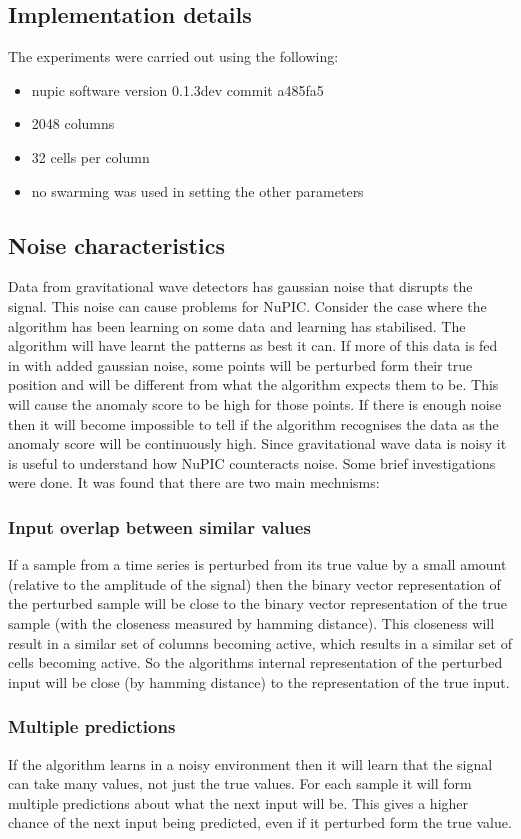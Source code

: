 \documentclass[a4paper]{jpconf}
\begin{document}
		
	\subsection{Implementation details}
		The experiments were carried out using the following:
		\begin{itemize}
		\item nupic software version 0.1.3dev commit a485fa5
		\item 2048 columns
		\item 32 cells per column
		\item no swarming was used in setting the other parameters
		\end{itemize}

	\subsection{Noise characteristics}
		Data from gravitational wave detectors has gaussian noise that disrupts the signal. This noise can cause problems for NuPIC. Consider the case where the algorithm has been learning on some data and learning has stabilised. The algorithm will have learnt the patterns as best it can. If more of this data is fed in with added gaussian noise, some points will be perturbed form their true position and will be different from what the algorithm expects them to be. This will cause the anomaly score to be high for those points. If there is enough noise then it will become impossible to tell if the algorithm recognises the data as the anomaly score will be continuously high. Since gravitational wave data is noisy it is useful to understand how NuPIC counteracts noise.
		Some brief investigations were done. It was found that there are two main mechnisms:
		\subsubsection*{Input overlap between similar values}
			If a sample from a time series is perturbed from its true value by a small amount (relative to the amplitude of the signal) then the binary vector representation of the perturbed sample will be close to the binary vector representation of the true sample (with the closeness measured by hamming distance). This closeness will result in a similar set of columns becoming active, which results in a similar set of cells becoming active. So the algorithms internal representation of the perturbed input will be close (by hamming distance) to the representation of the true input.
		\subsubsection*{Multiple predictions}
			If the algorithm learns in a noisy environment then it will learn that the signal can take many values, not just the true values. For each sample it will form multiple predictions about what the next input will be. This gives a higher chance of the next input being predicted, even if it perturbed form the true value.
			
\end{document}
